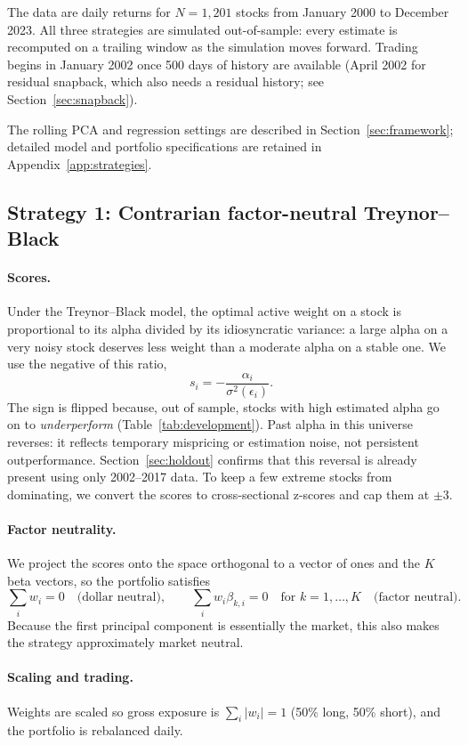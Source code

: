 \documentclass[11pt,letterpaper]{article}
\begin{document}
The data are daily returns for $N = 1{,}201$ stocks from January 2000 to December 2023. All three strategies are simulated out-of-sample: every estimate is recomputed on a trailing window as the simulation moves forward. Trading begins in January 2002 once 500 days of history are available (April 2002 for residual snapback, which also needs a residual history; see Section~\ref{sec:snapback}).

The rolling PCA and regression settings are described in Section~\ref{sec:framework}; detailed model and portfolio specifications are retained in Appendix~\ref{app:strategies}.

\subsection{Strategy 1: Contrarian factor-neutral Treynor--Black}

\paragraph{Scores.} Under the Treynor--Black model, the optimal active weight on a stock is proportional to its alpha divided by its idiosyncratic variance: a large alpha on a very noisy stock deserves less weight than a moderate alpha on a stable one. We use the negative of this ratio,
\[
    s_i = -\frac{\alpha_i}{\sigma^2(\epsilon_i)}.
\]
The sign is flipped because, out of sample, stocks with high estimated alpha go on to \emph{underperform} (Table~\ref{tab:development}). Past alpha in this universe reverses: it reflects temporary mispricing or estimation noise, not persistent outperformance. Section~\ref{sec:holdout} confirms that this reversal is already present using only 2002--2017 data. To keep a few extreme stocks from dominating, we convert the scores to cross-sectional z-scores and cap them at $\pm 3$.

\paragraph{Factor neutrality.} We project the scores onto the space orthogonal to a vector of ones and the $K$ beta vectors, so the portfolio satisfies
\[
    \sum_i w_i = 0 \quad \text{(dollar neutral)}, \qquad \sum_i w_i \beta_{k,i} = 0 \quad \text{for } k = 1, \dots, K \quad \text{(factor neutral)}.
\]
Because the first principal component is essentially the market, this also makes the strategy approximately market neutral.

\paragraph{Scaling and trading.} Weights are scaled so gross exposure is $\sum_i |w_i| = 1$ (50\% long, 50\% short), and the portfolio is rebalanced daily.
\end{document}
